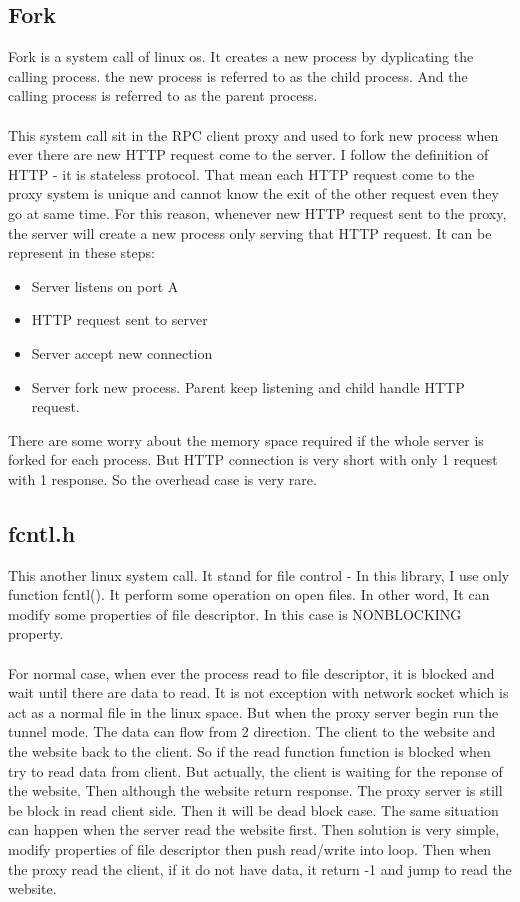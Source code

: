 \documentclass{article}
\begin{document}
\subsection{Fork}
Fork is a system call of linux os. It creates a new process by dyplicating
the calling process. the new process is referred to as the child process.
And the calling process is referred to as the parent process.\\
\\
This system call sit in the RPC client proxy and used to fork 
new process when ever there are new HTTP request come to the server.
I follow the definition of HTTP - it is stateless protocol. That mean
each HTTP request come to the proxy system is unique 
and cannot know the exit of the other request even they go at same time.
For this reason, whenever new HTTP request sent to the proxy, the server
will create a new process only serving that HTTP request. It can be
represent in these steps:
\begin{itemize}
\item Server listens on port A
\item HTTP request sent to server
\item Server accept new connection
\item Server fork new process. Parent keep listening
and child handle HTTP request.
\end{itemize}
There are some worry about the memory space required if the whole server is
forked for each process. But HTTP connection is very short with only 1 request
with 1 response. So the overhead case is very rare.
\subsection{fcntl.h}
This another linux system call. It stand for file control - In this library,
I use only function fcntl(). It perform some operation on open files. In other
word, It can modify some properties of file descriptor. In this case is NONBLOCKING
property.\\
\\
For normal case, when ever the process read to file descriptor,
it is blocked and wait until there are data to read. It is not exception with
network socket which is act as a normal file in the linux space. But when the
proxy server begin run the tunnel mode. The data can flow from 2 direction. The
client to the website and the website back to the client. So if the read function
function is blocked when try to read data from client. But actually, the client
is waiting for the reponse of the website. Then although the website return response.
The proxy server is still be block in read client side. Then it will be dead block case.
The same situation can happen when the server read the website first. Then solution is
very simple, modify properties of file descriptor then push read/write into loop. Then
when the proxy read the client, if it do not have data, it return -1 and jump to read 
the website.
\end{document}
